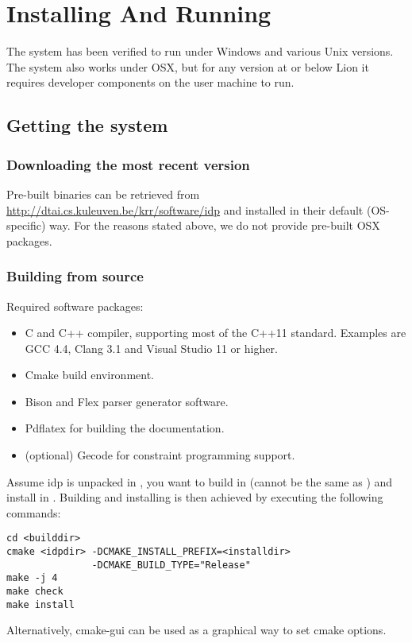 \section{Installing And Running}
The system has been verified to run under Windows and various Unix versions.
The system also works under OSX, but for any version at or below Lion it requires developer components on the user machine to run.

\subsection{Getting the system}
\subsubsection{Downloading the most recent version}
Pre-built binaries can be retrieved from \url{http://dtai.cs.kuleuven.be/krr/software/idp} and installed in their default (OS-specific) way.
For the reasons stated above, we do not provide pre-built OSX packages. 

\subsubsection{Building from source}
Required software packages:
\begin{itemize}
  \item C and C++ compiler, supporting most of the C++11 standard. Examples are GCC 4.4, Clang 3.1 and Visual Studio 11 or higher.
  \item Cmake build environment. 
  \item Bison and Flex parser generator software.
  \item Pdflatex for building the documentation.
  \item (optional) Gecode for constraint programming support.
\end{itemize}

Assume idp is unpacked in , you want to build in  (cannot be the same as ) and install in . Building and installing is then achieved by executing the following commands:
\begin{lstlisting}
cd <builddir>
cmake <idpdir> -DCMAKE_INSTALL_PREFIX=<installdir> 
               -DCMAKE_BUILD_TYPE="Release"
make -j 4
make check
make install
\end{lstlisting}

Alternatively, cmake-gui can be used as a graphical way to set cmake options.

